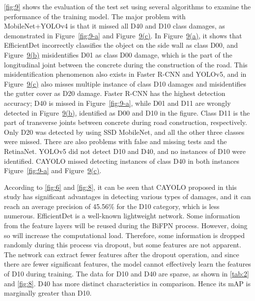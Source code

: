 \documentclass[sensors,article,submit,moreauthors]{Definitions/mdpi}
\begin{document}
    \autoref{fig:9} shows the evaluation of the test set using several algorithms to examine the performance of the training model. The major problem with MobileNet+YOLOv4 is that it missed all D40 and D10 class damages, as demonstrated in Figure~\autoref{fig:9-a} and Figure~\hyperref[fig:9-c]{9(c)}. In Figure~\hyperref[fig:9-a]{9(a)}, it shows that EfficientDet incorrectly classifies the object on the side wall as class D00, and Figure~\hyperref[fig:9-b]{9(b)} misidentifies D01 as class D00 damage, which is the part of the longitudinal joint between the concrete during the construction of the road. This misidentification phenomenon also exists in Faster R-CNN and YOLOv5, and in Figure~\hyperref[fig:9-c]{9(c)} also misses multiple instance of class D10 damages and misidentifies the gutter cover as D20 damage. Faster R-CNN has the highest detection accuracy; D40 is missed in Figure~\autoref{fig:9-a}, while D01 and D11 are wrongly detected in Figure~\hyperref[fig:9-b]{9(b)}, identified as D00 and D10 in the figure. Class D11 is the part of transverse joints between concrete during road construction, respectively. Only D20 was detected by using SSD MobileNet, and all the other three classes were missed. There are also problems with false and missing tests and the RetinaNet. YOLOv5 did not detect D10 and D40, and no instances of D10 were identified. CAYOLO missed detecting instances of class D40 in both instances Figure~\autoref{fig:9-a} and Figure~\hyperref[fig:9-c]{9(c)}.

    According to \autoref{fig:6} and \autoref{fig:8}, it can be seen that CAYOLO proposed in this study has significant advantages in detecting various types of damages, and it can reach an average precision of 45.56\% for the D10 category, which is less numerous. EfficientDet is a well-known lightweight network. Some information from the feature layers will be reused during the BiFPN process. However, doing so will increase the computational load. Therefore, some information is dropped randomly during this process via dropout, but some features are not apparent. The network can extract fewer features after the dropout operation, and since there are fewer significant features, the model cannot effectively learn the features of D10 during training. The data for D10 and D40 are sparse, as shown in \autoref{tab:2} and \autoref{fig:8}. D40 has more distinct characteristics in comparison. Hence its mAP is marginally greater than D10.
\end{document}
